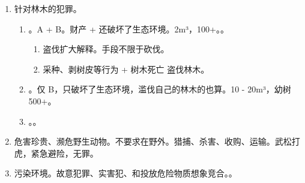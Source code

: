 \begin{enumerate}
        \begin{enumerate}
          \item 针对林木的犯罪。
                \begin{enumerate}
                  \item {}。A + B。财产 + 还破坏了生态环境。2m³，100+。。
                        \begin{enumerate}
                          \item 盗伐扩大解释。手段不限于砍伐。
                          \item 采种、剥树皮等行为 + 树木死亡 \yjt 盗伐林木。
                        \end{enumerate}
                  \item {}。仅 B，只破坏了生态环境，滥伐自己的林木的也算。10 - 20m³，幼树 500+。
                  \item {}。。
                \end{enumerate}
          \item 危害珍贵、濒危野生动物。不要求在野外。猎捕、杀害、收购、运输。武松打虎，紧急避险，无罪。
          \item 污染环境。故意犯罪、实害犯、和投放危险物质想象竞合。。
        \end{enumerate}
\end{enumerate}

